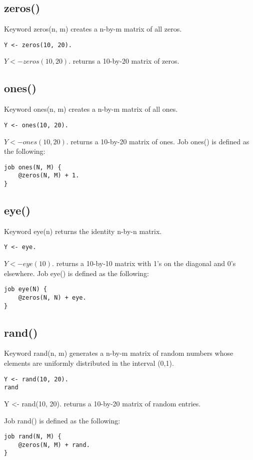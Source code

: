 \documentclass[prodmode,acmtecs]{acmsmall}
\begin{document}
\subsection{zeros()}
Keyword zeros(n, m) creates a n-by-m matrix of all zeros.
\begin{lstlisting}
Y <- zeros(10, 20).
\end{lstlisting}

$Y <- zeros(10, 20).$ returns a 10-by-20 matrix of zeros.
\medskip

\subsection{ones()}
Keyword ones(n, m) creates a n-by-m matrix of all ones.
\begin{lstlisting}
Y <- ones(10, 20).
\end{lstlisting}

$Y <- ones(10, 20).$ returns a 10-by-20 matrix of ones.
Job ones() is defined as the following:
\begin{lstlisting}
job ones(N, M) {
    @zeros(N, M) + 1.
}
\end{lstlisting}
\medskip

\subsection{eye()}
Keyword eye(n) returns the identity n-by-n matrix.
\begin{lstlisting}
Y <- eye.
\end{lstlisting}

$Y <- eye(10).$ returns a 10-by-10 matrix with 1's on the diagonal and 0's elsewhere.
Job eye() is defined as the following:
\begin{lstlisting}
job eye(N) {
    @zeros(N, N) + eye.
} 
\end{lstlisting}
\medskip

\subsection{rand()}
Keyword rand(n, m) generates a n-by-m matrix of random numbers whose elements are
uniformly distributed in the interval (0,1).
\begin{lstlisting}
Y <- rand(10, 20).
rand
\end{lstlisting}

Y <- rand(10, 20). returns a 10-by-20 matrix of random entries.

Job rand() is defined as the following:
\begin{lstlisting}
job rand(N, M) {
    @zeros(N, M) + rand.
} 
\end{lstlisting}
\medskip
\end{document}
